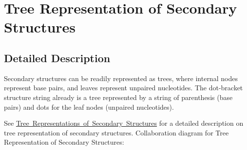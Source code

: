 \hypertarget{group__struct__utils__tree}{}\section{Tree Representation of Secondary Structures}
\label{group__struct__utils__tree}


\subsection{Detailed Description}
Secondary structures can be readily represented as trees, where internal nodes represent base pairs, and leaves represent unpaired nucleotides. The dot-\/bracket structure string already is a tree represented by a string of parenthesis (base pairs) and dots for the leaf nodes (unpaired nucleotides).

See \mbox{\hyperlink{rna_structure_notations_sec_structure_representations_tree}{Tree Representations of Secondary Structures}} for a detailed description on tree representation of secondary structures. Collaboration diagram for Tree Representation of Secondary Structures\+:
